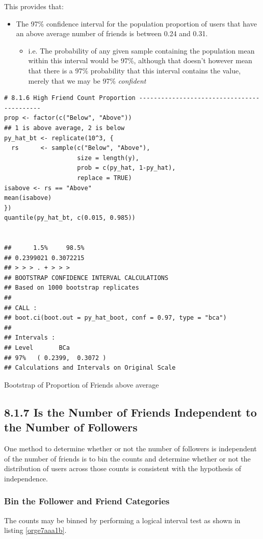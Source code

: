 \documentclass[11pt]{article}
\begin{document}
This provides that:
\begin{itemize}
\item The 97\% confidence interval for the population proportion of users that have an above average number of friends is between 0.24 and 0.31.
\begin{itemize}
\item i.e. The probability of any given sample containing the population mean within this interval would be 97\%, although  that doesn't however mean that there is a 97\% probability that this interval contains the value, merely that we may be 97\% \emph{confident}
\end{itemize}
\end{itemize}

\begin{listing}[htbp]
\begin{verbatim}
# 8.1.6 High Friend Count Proportion -------------------------------------------
prop <- factor(c("Below", "Above"))
## 1 is above average, 2 is below
py_hat_bt <- replicate(10^3, {
  rs      <- sample(c("Below", "Above"),
                    size = length(y),
                    prob = c(py_hat, 1-py_hat),
                    replace = TRUE)
isabove <- rs == "Above"
mean(isabove)
})
quantile(py_hat_bt, c(0.015, 0.985))


##      1.5%     98.5%
## 0.2399021 0.3072215
## > > > . + > > >
## BOOTSTRAP CONFIDENCE INTERVAL CALCULATIONS
## Based on 1000 bootstrap replicates
##
## CALL :
## boot.ci(boot.out = py_hat_boot, conf = 0.97, type = "bca")
##
## Intervals :
## Level       BCa
## 97%   ( 0.2399,  0.3072 )
## Calculations and Intervals on Original Scale
\end{verbatim}
\caption{\label{org12ed2c0}Bootstrap of Proportion of Friends above average}
\end{listing}
\subsection{8.1.7 Is the Number of Friends Independent to the Number of Followers}
\label{sec:orgd350321}
One method to determine whether or not the number of followers is independent of the number of friends is to bin the counts and determine whether or not the distribution of users across those counts is consistent with the hypothesis of independence.

\subsubsection{Bin the Follower and Friend Categories}
\label{sec:orge2d3b55}
The counts may be binned by performing a logical interval test as shown in listing \ref{orge7aaa1b}.
\end{document}

